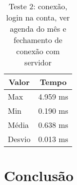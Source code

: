 \documentclass[10pt,a4paper]{article}
\begin{document}
\begin{table}[h!]
\caption{Teste 5: conexão, login na conta, ver todos os compromissos do mês e fechamento de conexão com servidor}
\begin{center}

\end{center}
\end{table}



\begin{table}[h!]
\caption{Teste 2: conexão, login na conta, ver agenda do mês e fechamento de conexão com servidor}
\begin{center}
  \begin{tabular}{lr}
    \multicolumn{1}{c}{Valor} & \multicolumn{1}{c}{Tempo}\\
    \hline
    Max & 4.959 ms\\
    Min & 0.190 ms\\
    Média & 0.638 ms \\
    Desvio & 0.013 ms
  \end{tabular}

\end{center}
\end{table}


\section{Conclusão}


\begin{small}
  
\end{small}
\end{document}
